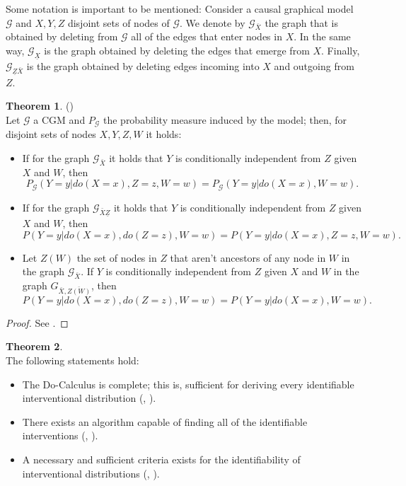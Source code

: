 \documentclass[english,letterpaper,12pt,final]{article}
\theoremstyle{definition}
\newtheorem{teo}{Theorem}[section]
\begin{document}
	Some notation is important to be mentioned: Consider a causal graphical model $\mathcal{G}$ and $X,Y,Z$ disjoint sets of nodes of $\mathcal{G}$. We denote by $\mathcal{G}_{\bar{X}}$ the graph that is obtained by deleting from $\mathcal{G}$ all of the edges that enter nodes in $X$. In the same way, $\mathcal{G}_{\underline{X}}$ is the graph obtained by deleting the edges that emerge from $X$. Finally, $\mathcal{G}_{\underline{Z}\bar{X}}$ is the graph obtained by deleting edges incoming into $X$ and outgoing from $Z$.
	
	\begin{teo}{\label{docalculus}} (\cite{pearl2009causality})\\
Let $\mathcal{G}$ a CGM and $P_{\mathcal{G}}$ the probability measure induced by the model; then, for disjoint sets of nodes $X,Y,Z,W$ it holds:
\begin{itemize}
\item If for the graph $\mathcal{G}_{\bar{X}}$ it holds that $Y$ is conditionally independent from  $Z$ given $X$ and $W$, then
\[ P_{\mathcal{G}}(Y=y | do(X=x), Z=z, W=w) = P_{\mathcal{G}}(Y=y | do(X=x), W=w). \]
\item If for the graph $\mathcal{G}_{\bar{X}\underline{Z}}$ it holds that $Y$ is conditionally independent from $Z$ given $X$ and $W$, then
\[ P(Y=y | do(X=x), do(Z=z), W=w) = P(Y=y | do(X=x), Z = z, W=w). \]
\item Let $Z(W)$ the set of nodes in  $Z$ that aren't ancestors of any node in  $W$ in the graph $\mathcal{G}_{\bar{X}}$.  If $Y$ is conditionally independent from $Z$ given $X$ and $W$ in the graph $G_{\bar{X}, \bar{Z(W)}}$, then
\[ P(Y=y | do(X=x), do(Z=z), W=w) = P(Y=y | do(X=x), W=w). \]
\end{itemize}
\end{teo}
\begin{proof}
See \cite{pearl2009causality}.
\end{proof}
\begin{teo}{\cite{peters2017elements}}\\
The following statements hold:
\begin{itemize}
\item The Do-Calculus is complete; this is, sufficient for deriving every identifiable interventional distribution (\cite{huang2006pearl}, \cite{shpitser2006identification}).
\item There exists an algorithm capable of finding all of the identifiable interventions (\cite{tian2002}, \cite{huang2006pearl}).
\item A necessary and sufficient criteria exists for the identifiability of interventional distributions (\cite{shpitser2006identification}, \cite{huang2006pearl}).
\end{itemize}
\end{teo}
\end{document}
